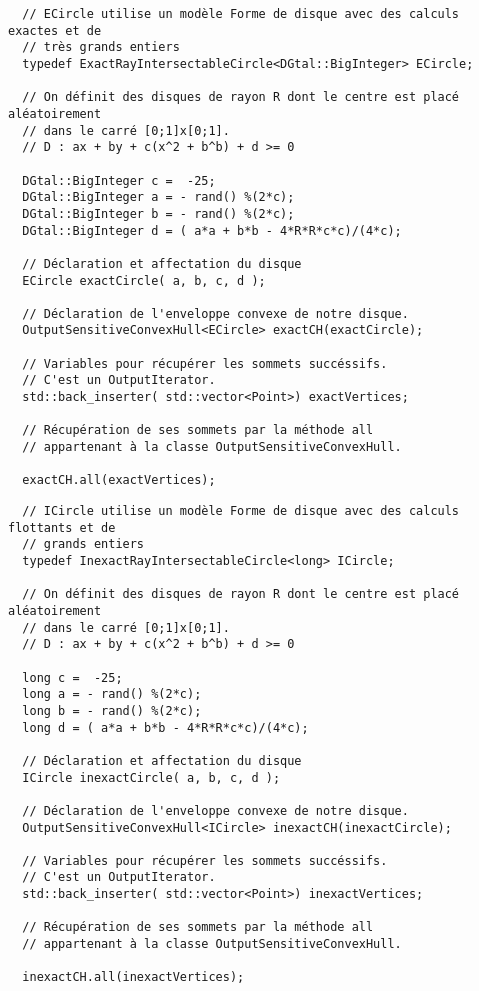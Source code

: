 \begin{verbatim}
  // ECircle utilise un modèle Forme de disque avec des calculs exactes et de 
  // très grands entiers
  typedef ExactRayIntersectableCircle<DGtal::BigInteger> ECircle;
    
  // On définit des disques de rayon R dont le centre est placé aléatoirement
  // dans le carré [0;1]x[0;1].
  // D : ax + by + c(x^2 + b^b) + d >= 0
    
  DGtal::BigInteger c =  -25;
  DGtal::BigInteger a = - rand() %(2*c);
  DGtal::BigInteger b = - rand() %(2*c);  
  DGtal::BigInteger d = ( a*a + b*b - 4*R*R*c*c)/(4*c);
  
  // Déclaration et affectation du disque
  ECircle exactCircle( a, b, c, d );	 
  
  // Déclaration de l'enveloppe convexe de notre disque.
  OutputSensitiveConvexHull<ECircle> exactCH(exactCircle);
  
  // Variables pour récupérer les sommets succéssifs.
  // C'est un OutputIterator.
  std::back_inserter( std::vector<Point>) exactVertices;
  
  // Récupération de ses sommets par la méthode all 
  // appartenant à la classe OutputSensitiveConvexHull.

  exactCH.all(exactVertices);  
\end{verbatim}
\begin{verbatim}
  // ICircle utilise un modèle Forme de disque avec des calculs flottants et de 
  // grands entiers 
  typedef InexactRayIntersectableCircle<long> ICircle;
    
  // On définit des disques de rayon R dont le centre est placé aléatoirement
  // dans le carré [0;1]x[0;1].
  // D : ax + by + c(x^2 + b^b) + d >= 0
    
  long c =  -25;
  long a = - rand() %(2*c);
  long b = - rand() %(2*c);  
  long d = ( a*a + b*b - 4*R*R*c*c)/(4*c);
  
  // Déclaration et affectation du disque
  ICircle inexactCircle( a, b, c, d );	  
  
  // Déclaration de l'enveloppe convexe de notre disque.
  OutputSensitiveConvexHull<ICircle> inexactCH(inexactCircle);
  
  // Variables pour récupérer les sommets succéssifs.
  // C'est un OutputIterator.
  std::back_inserter( std::vector<Point>) inexactVertices;
  
  // Récupération de ses sommets par la méthode all 
  // appartenant à la classe OutputSensitiveConvexHull.

  inexactCH.all(inexactVertices); 
\end{verbatim}


